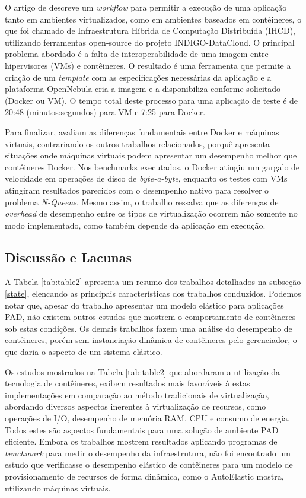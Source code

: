 \documentclass[twoside,english,brazilian]{UNISINOSartigo}
\begin{document}
O artigo de  descreve um \textit{workflow} para permitir a execução de uma aplicação tanto em ambientes virtualizados, como em ambientes baseados em contêineres, o que foi chamado de Infraestrutura Híbrida de Computação Distribuída (IHCD), utilizando ferramentas open-source do projeto INDIGO-DataCloud. O principal problema abordado é a falta de interoperabilidade de uma imagem entre hipervisores (VMs) e contêineres. O resultado é uma ferramenta que permite a criação de um \textit{template} com as especificações necessárias da aplicação e a plataforma OpenNebula cria a imagem e a disponibiliza conforme solicitado (Docker ou VM). O tempo total deste processo para uma aplicação de teste é de 20:48 (minutos:segundos) para VM e 7:25 para Docker.

Para finalizar,  avaliam as diferenças fundamentais entre Docker e máquinas virtuais, contrariando os outros trabalhos relacionados, porquê apresenta situações onde máquinas virtuais podem apresentar um desempenho melhor que contêineres Docker. Nos benchmarks executados, o Docker atingiu um gargalo de velocidade em operações de disco de \textit{byte-a-byte}, enquanto os testes com VMs atingiram resultados parecidos com o desempenho nativo para resolver o problema \textit{N-Queens}. Mesmo assim, o trabalho ressalva que as diferenças de \textit{overhead} de desempenho entre os tipos de virtualização ocorrem não somente no modo implementado, como também depende da aplicação em execução. 

\subsection{Discussão e Lacunas}
\label{comparacao}
A Tabela \ref{tab:table2} apresenta um resumo dos trabalhos detalhados na subseção \ref{state}, elencando as principais características dos trabalhos conduzidos. Podemos notar que, apesar do trabalho  apresentar um modelo elástico para aplicações PAD, não existem outros estudos que mostrem o comportamento de contêineres sob estas condições. Os demais trabalhos fazem uma análise do desempenho de contêineres, porém sem instanciação dinâmica de contêineres pelo gerenciador, o que daria o aspecto de um sistema elástico.

Os estudos mostrados na Tabela \ref{tab:table2} que abordaram a utilização da tecnologia de contêineres, exibem resultados mais favoráveis à estas implementações em comparação ao método tradicionais de virtualização, abordando diversos aspectos inerentes à virtualização de recursos, como operações de I/O, desempenho de memória RAM, CPU e consumo de energia. Todos estes são aspectos fundamentais para uma solução de ambiente PAD eficiente. Embora os trabalhos mostrem resultados aplicando programas de \textit{benchmark} para medir o desempenho da infraestrutura, não foi encontrado um estudo que verificasse o desempenho elástico de contêineres para um modelo de provisionamento de recursos de forma dinâmica, como o AutoElastic mostra, utilizando máquinas virtuais.
\end{document}
